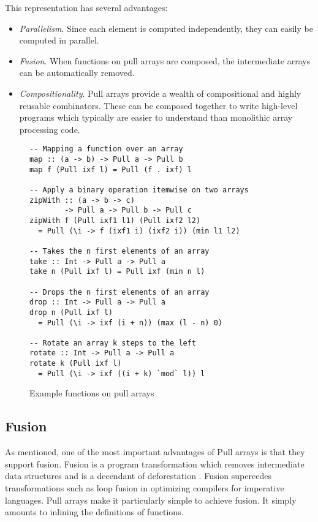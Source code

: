 \documentclass{sigplanconf}
\begin{document}
This representation has several advantages:
\begin{itemize}
\item \emph{Parallelism}. Since each element is computed
  independently, they can easily be computed in parallel.
\item \emph{Fusion}. When functions on pull arrays are composed, the intermediate
  arrays can be automatically removed. 
\item \emph{Compositionality}. Pull arrays provide a wealth of
  compositional and highly reusable combinators. These can be composed
  together to write high-level programs which typically are easier to
  understand than monolithic array processing code.
\end{itemize}

\begin{figure}
\begin{verbatim}
-- Mapping a function over an array
map :: (a -> b) -> Pull a -> Pull b
map f (Pull ixf l) = Pull (f . ixf) l

-- Apply a binary operation itemwise on two arrays
zipWith :: (a -> b -> c)
        -> Pull a -> Pull b -> Pull c
zipWith f (Pull ixf1 l1) (Pull ixf2 l2)
  = Pull (\i -> f (ixf1 i) (ixf2 i)) (min l1 l2)

-- Takes the n first elements of an array
take :: Int -> Pull a -> Pull a
take n (Pull ixf l) = Pull ixf (min n l)

-- Drops the n first elements of an array
drop :: Int -> Pull a -> Pull a
drop n (Pull ixf l)
  = Pull (\i -> ixf (i + n)) (max (l - n) 0)

-- Rotate an array k steps to the left
rotate :: Int -> Pull a -> Pull a
rotate k (Pull ixf l)
  = Pull (\i -> ixf ((i + k) `mod` l)) l
\end{verbatim}
\caption{Example functions on pull arrays}
\end{figure}

\subsection{Fusion}

As mentioned, one of the most important advantages of Pull arrays is
that they support
fusion\cite{gill1993short,axelsson2010feldspar,keller2010regular}. Fusion
is a program transformation which removes intermediate data structures
and is a decendant of deforestation
\cite{wadler1990deforestation}. Fusion supercedes transformations such
as loop fusion in optimizing compilers for imperative languages.  Pull
arrays make it particularly simple to achieve fusion. It simply
amounts to inlining the definitions of functions.
\end{document}

